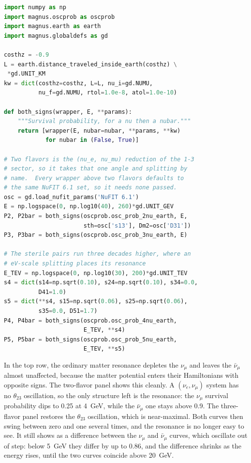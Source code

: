 \documentclass[final,5p,times,twocolumn,sort,compress]{elsarticle}
\makeatletter
\newcommand{\fig}{Fig.}
\DeclareRobustCommand{\_}{%
  \ifmmode\nfss@text{\textunderscore}\else\textunderscore\allowbreak\fi}
\newcommand{\figu}[1]{\fig~\ref{fig:#1}}
\makeatother
\begin{document}
\begin{lstlisting}[language=Python, caption={\textbf{Neutrinos and antineutrinos through the Earth.} The $\nu_\mu$ and $\bar{\nu}_\mu$ curves of \figu{nu_nubar}. {\tt both\_signs} calls a wrapper twice, with {\tt nubar=False} for the neutrino and {\tt nubar=True} for the antineutrino. See notebooks \#15 and \#28, and Sec.~\ref{sec:nu_nubar} for details.}, label={lst:nu_nubar}, float=t]
import numpy as np
import magnus.oscprob as oscprob
import magnus.earth as earth
import magnus.globaldefs as gd

costhz = -0.9
L = earth.distance_traveled_inside_earth(costhz) \
 *gd.UNIT_KM
kw = dict(costhz=costhz, L=L, nu_i=gd.NUMU,
          nu_f=gd.NUMU, rtol=1.0e-8, atol=1.0e-10)

def both_signs(wrapper, E, **params):
    """Survival probability, for a nu then a nubar."""
    return [wrapper(E, nubar=nubar, **params, **kw)
            for nubar in (False, True)]

# Two flavors is the (nu_e, nu_mu) reduction of the 1-3
# sector, so it takes that one angle and splitting by
# name.  Every wrapper above two flavors defaults to
# the same NuFIT 6.1 set, so it needs none passed.
osc = gd.load_nufit_params('NuFIT 6.1')
E = np.logspace(0, np.log10(40), 260)*gd.UNIT_GEV
P2, P2bar = both_signs(oscprob.osc_prob_2nu_earth, E,
                       sth=osc['s13'], Dm2=osc['D31'])
P3, P3bar = both_signs(oscprob.osc_prob_3nu_earth, E)

# The sterile pairs run three decades higher, where an
# eV-scale splitting places its resonance
E_TEV = np.logspace(0, np.log10(30), 200)*gd.UNIT_TEV
s4 = dict(s14=np.sqrt(0.10), s24=np.sqrt(0.10), s34=0.0,
          D41=1.0)
s5 = dict(**s4, s15=np.sqrt(0.06), s25=np.sqrt(0.06),
          s35=0.0, D51=1.7)
P4, P4bar = both_signs(oscprob.osc_prob_4nu_earth,
                       E_TEV, **s4)
P5, P5bar = both_signs(oscprob.osc_prob_5nu_earth,
                       E_TEV, **s5)
\end{lstlisting}

In the top row, the ordinary matter resonance depletes the $\nu_\mu$ and leaves the $\bar{\nu}_\mu$ almost unaffected, because the matter potential enters their Hamiltonians with opposite signs. The two-flavor panel shows this cleanly. A $(\nu_e, \nu_\mu)$ system has no $\theta_{23}$ oscillation, so the only structure left is the resonance: the $\nu_\mu$ survival probability dips to 0.25 at 4~GeV, while the $\bar{\nu}_\mu$ one stays above 0.9. The three-flavor panel restores the $\theta_{23}$ oscillation, which is near-maximal. Both curves then swing between zero and one several times, and the resonance is no longer easy to see. It still shows as a difference between the $\nu_\mu$ and $\bar{\nu}_\mu$ curves, which oscillate out of step: below 5~GeV they differ by up to 0.86, and the difference shrinks as the energy rises, until the two curves coincide above 20~GeV.
\end{document}
